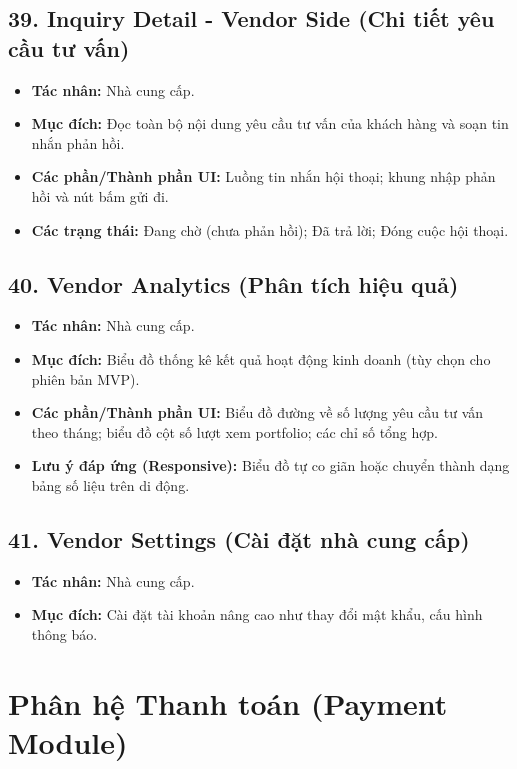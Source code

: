 \documentclass[11pt,a4paper]{article}
\begin{document}
\subsection{39. Inquiry Detail - Vendor Side (Chi tiết yêu cầu tư vấn)}
\begin{itemize}
    \item \textbf{Tác nhân:} Nhà cung cấp.
    \item \textbf{Mục đích:} Đọc toàn bộ nội dung yêu cầu tư vấn của khách hàng và soạn tin nhắn phản hồi.
    \item \textbf{Các phần/Thành phần UI:} Luồng tin nhắn hội thoại; khung nhập phản hồi và nút bấm gửi đi.
    \item \textbf{Các trạng thái:} Đang chờ (chưa phản hồi); Đã trả lời; Đóng cuộc hội thoại.
\end{itemize}

\subsection{40. Vendor Analytics (Phân tích hiệu quả)}
\begin{itemize}
    \item \textbf{Tác nhân:} Nhà cung cấp.
    \item \textbf{Mục đích:} Biểu đồ thống kê kết quả hoạt động kinh doanh (tùy chọn cho phiên bản MVP).
    \item \textbf{Các phần/Thành phần UI:} Biểu đồ đường về số lượng yêu cầu tư vấn theo tháng; biểu đồ cột số lượt xem portfolio; các chỉ số tổng hợp.
    \item \textbf{Lưu ý đáp ứng (Responsive):} Biểu đồ tự co giãn hoặc chuyển thành dạng bảng số liệu trên di động.
\end{itemize}

\subsection{41. Vendor Settings (Cài đặt nhà cung cấp)}
\begin{itemize}
    \item \textbf{Tác nhân:} Nhà cung cấp.
    \item \textbf{Mục đích:} Cài đặt tài khoản nâng cao như thay đổi mật khẩu, cấu hình thông báo.
\end{itemize}

\section{Phân hệ Thanh toán (Payment Module)}
\end{document}
